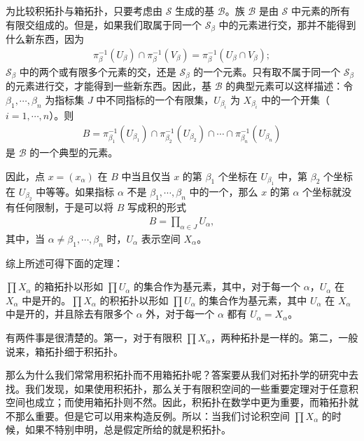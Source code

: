 \documentclass[../../main.tex]{subfiles}
\begin{document}
为比较积拓扑与箱拓扑，只要考虑由 $\mathcal{S}$ 生成的基 $\mathcal{B}$。族 $\mathcal{B}$ 是由 $\mathcal{S}$ 中元素的所有有限交组成的。但是，如果我们取属于同一个 $\mathcal{S}_{\beta}$ 中的元素进行交，那并不能得到什么新东西，因为
\begin{align*}
\pi_{\beta}^{-1}(U_{\beta}) \cap \pi_{\beta}^{-1}(V_{\beta}) = \pi_{\beta}^{-1}(U_{\beta} \cap V_{\beta});
\end{align*}
$\mathcal{S}_{\beta}$ 中的两个或有限多个元素的交，还是 $\mathcal{S}_{\beta}$ 的一个元素。只有取不属于同一个 $\mathcal{S}_{\beta}$ 的元素进行交，才能得到一些新东西。因此，基 $\mathcal{B}$ 的典型元素可以这样描述：令 $\beta_{1}, \cdots, \beta_{n}$ 为指标集 $J$ 中不同指标的一个有限集，$U_{\beta_{i}}$ 为 $X_{\beta_{i}}$ 中的一个开集（$i = 1, \cdots, n$）。则
\begin{align*}
B = \pi_{\beta_{1}}^{-1}(U_{\beta_{1}}) \cap \pi_{\beta_{2}}^{-1}(U_{\beta_{2}}) \cap \cdots \cap \pi_{\beta_{n}}^{-1}(U_{\beta_{n}})
\end{align*}
是 $\mathcal{B}$ 的一个典型的元素。

因此，点 $x = (x_{\alpha})$ 在 $B$ 中当且仅当 $x$ 的第 $\beta_{1}$ 个坐标在 $U_{\beta_{1}}$ 中，第 $\beta_{2}$ 个坐标在 $U_{\beta_{2}}$ 中等等。如果指标 $\alpha$ 不是 $\beta_{1}, \cdots, \beta_{n}$ 中的一个，那么 $x$ 的第 $\alpha$ 个坐标就没有任何限制，于是可以将 $B$ 写成积的形式
\begin{align*}
B = \prod_{\alpha \in J} U_{\alpha},
\end{align*}
其中，当 $\alpha \neq \beta_{1}, \cdots, \beta_{n}$ 时，$U_{\alpha}$ 表示空间 $X_{\alpha}$。

综上所述可得下面的定理：

\begin{theorem}[箱拓扑与积拓扑的比较]\label{theorem:ch02-箱积比较}
$\prod X_{\alpha}$ 的箱拓扑以形如 $\prod U_{\alpha}$ 的集合作为基元素，其中，对于每一个 $\alpha$，$U_{\alpha}$ 在 $X_{\alpha}$ 中是开的。$\prod X_{\alpha}$ 的积拓扑以形如 $\prod U_{\alpha}$ 的集合作为基元素，其中 $U_{\alpha}$ 在 $X_{\alpha}$ 中是开的，并且除去有限多个 $\alpha$ 外，对于每一个 $\alpha$ 都有 $U_{\alpha} = X_{\alpha}$。

有两件事是很清楚的。第一，对于有限积 $\prod X_{\alpha}$，两种拓扑是一样的。第二，一般说来，箱拓扑细于积拓扑。
\end{theorem}

那么为什么我们常常用积拓扑而不用箱拓扑呢？答案要从我们对拓扑学的研究中去找。我们发现，如果使用积拓扑，那么关于有限积空间的一些重要定理对于任意积空间也成立；而使用箱拓扑则不然。因此，积拓扑在数学中更为重要，而箱拓扑就不那么重要。但是它可以用来构造反例。所以：当我们讨论积空间 $\prod X_{\alpha}$ 的时候，如果不特别申明，总是假定所给的就是积拓扑。
\end{document}
